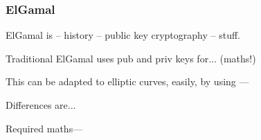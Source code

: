 \subsubsection{ElGamal}

ElGamal is -- history -- public key cryptography -- stuff.

Traditional ElGamal uses pub and priv keys for... (maths!)

This can be adapted to elliptic curves, easily, by using ---

Differences are...

Required maths---